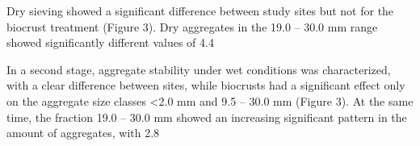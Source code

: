 {Dry sieving showed a significant difference between study sites but not for the biocrust treatment (Figure 3). Dry aggregates in the 19.0 – 30.0 mm range showed significantly different values of 4.4%

In a second stage, aggregate stability under wet conditions was characterized, with a clear difference between sites, while biocrusts had a significant effect only on the aggregate size classes <2.0 mm and 9.5 – 30.0 mm (Figure 3). At the same time, the fraction 19.0 – 30.0 mm showed an increasing significant pattern in the amount of aggregates, with 2.8%

}

